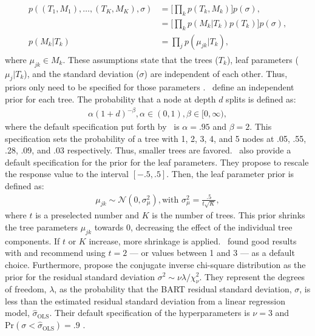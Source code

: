 \documentclass[10pt, a4paper, titlepage]{article}
\begin{document}
\begin{align}
\begin{split}
    \label{eq:independence_prior}
    p((T_1, M_1), \dots, (T_K, M_K), \sigma) &= \Big[\prod_{k}p(T_k, M_k)\Big]p(\sigma), \\
    &= \Big[\prod_{k}p(M_k|T_k)p(T_k)\Big]p(\sigma), \\
    p(M_k|T_k) &= \prod_{j}p(\mu_{jk}|T_k),
\end{split}
\end{align} where $\mu_{jk} \in M_k$. These assumptions state that the trees ($T_{k}$), leaf parameters ($\mu_{j}|T_{k}$), and the standard deviation ($\sigma$) are independent of each other. Thus, priors only need to be specified for those parameters \citep{chipman2010, hill2020, chipman2006, chipman1998}.~\citet{chipman1998} define an independent prior for each tree. The probability that a node at depth $d$ splits is defined as: 
\begin{align}
\label{eq:tree_prior}
    \alpha(1+d)^{-\beta}, \alpha \in (0,1), \beta \in [0, \infty),
\end{align} where the default specification put forth by~\citet{chipman2006,chipman2010} is $\alpha = .95$ and $\beta = 2$. This specification sets the probability of a tree with 1, 2, 3, 4, and 5 nodes at .05, .55, .28, .09, and .03 respectively. Thus, smaller trees are favored.~\citet{chipman2006,chipman2010} also provide a default specification for the prior for the leaf parameters. They propose to rescale the response value to the interval $[-.5,.5]$. Then, the leaf parameter prior is defined as: 
\begin{align}
\label{eq:leaf_prior}
    \mu_{jk} \sim \mathcal{N}(0, \sigma^2_{\mu}), \text{with } \sigma^2_{\mu} = \frac{.5}{t\sqrt{K}},
\end{align} where $t$ is a preselected number and $K$ is the number of trees. This prior shrinks the tree parameters $\mu_{jk}$ towards 0, decreasing the effect of the individual tree components. If $t$ or $K$ increase, more shrinkage is applied.~\citet{chipman2006,chipman2010} found good results with and recommend using $t = 2$ --- or values between 1 and 3 --- as a default choice. Furthermore, \citet{chipman2006,chipman2010} propose the conjugate inverse chi-square distribution as the prior for the residual standard deviation $\sigma^2 \sim \nu\lambda/\chi^{2}_{\nu}$. They represent the degrees of freedom, $\lambda$, as the probability that the BART residual standard deviation, $\sigma$, is less than the estimated residual standard deviation from a linear regression model, $\hat{\sigma}_\text{OLS}$. Their default specification of the hyperparameters is $\nu = 3$ and $\text{Pr}(\sigma < \hat{\sigma}_\text{OLS}) = .9$ \citep{chipman2010, hill2020, chipman2006, chipman1998}.
\end{document}
